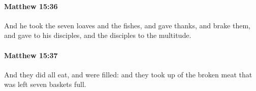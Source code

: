 		\paragraph{Matthew 15:36} %
			\label{MATTHEW-15-36}

			And he took the seven loaves and the fishes, and gave thanks, and brake them, and gave to his disciples, and the disciples to the multitude.

			\begin{framed}
			\scriptsize
				\begin{compactdesc}
					\item[SBLG] 
				\end{compactdesc}
			\end{framed}

		\paragraph{Matthew 15:37} %
			\label{MATTHEW-15-37}

			And they did all eat, and were filled: and they took up of the broken meat that was left seven baskets full.

